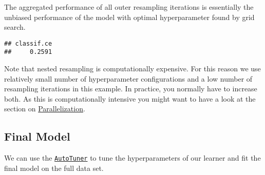 \documentclass[
]{scrbook}
\newenvironment{Shaded}{\begin{snugshade}}{\end{snugshade}}
\newcommand{\FunctionTok}[1]{\textcolor[rgb]{0.00,0.00,0.00}{#1}}
\newcommand{\NormalTok}[1]{#1}
\newcommand{\SpecialCharTok}[1]{\textcolor[rgb]{0.00,0.00,0.00}{#1}}
\renewenvironment{Shaded} {\begin{snugshade}\small} {\end{snugshade}}
\begin{document}
The aggregated performance of all outer resampling iterations is essentially the unbiased performance of the model with optimal hyperparameter found by grid search.

\begin{Shaded}
\end{Shaded}

\begin{verbatim}
## classif.ce 
##     0.2591
\end{verbatim}

Note that nested resampling is computationally expensive.
For this reason we use relatively small number of hyperparameter configurations and a low number of resampling iterations in this example.
In practice, you normally have to increase both.
As this is computationally intensive you might want to have a look at the section on \protect\hyperlink{parallelization}{Parallelization}.

\hypertarget{nested-final-model}{%
\subsection{Final Model}\label{nested-final-model}}

We can use the \href{https://mlr3tuning.mlr-org.com/reference/AutoTuner.html}{\texttt{AutoTuner}} to tune the hyperparameters of our learner and fit the final model on the full data set.

\begin{Shaded}
\end{Shaded}
\end{document}
